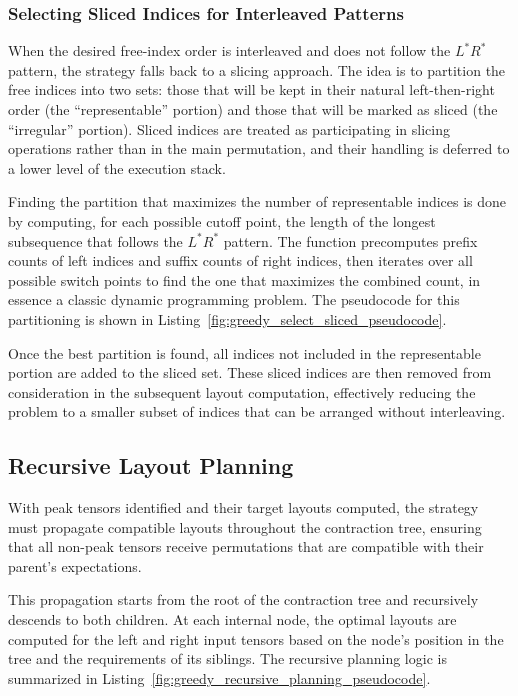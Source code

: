 \subsubsection{Selecting Sliced Indices for Interleaved Patterns}

When the desired free-index order is interleaved and does not follow the $L^* R^*$ pattern, the strategy falls back to a slicing approach. The idea is to partition the free indices into two sets: those that will be kept in their natural left-then-right order (the ``representable'' portion) and those that will be marked as sliced (the ``irregular'' portion). Sliced indices are treated as participating in slicing operations rather than in the main permutation, and their handling is deferred to a lower level of the execution stack.

Finding the partition that maximizes the number of representable indices is done by computing, for each possible cutoff point, the length of the longest subsequence that follows the $L^* R^*$ pattern. The function precomputes prefix counts of left indices and suffix counts of right indices, then iterates over all possible switch points to find the one that maximizes the combined count, in essence a classic dynamic programming problem. The pseudocode for this partitioning is shown in Listing~\ref{fig:greedy_select_sliced_pseudocode}.

Once the best partition is found, all indices not included in the representable portion are added to the sliced set. These sliced indices are then removed from consideration in the subsequent layout computation, effectively reducing the problem to a smaller subset of indices that can be arranged without interleaving.

\subsection{Recursive Layout Planning}

With peak tensors identified and their target layouts computed, the strategy must propagate compatible layouts throughout the contraction tree, ensuring that all non-peak tensors receive permutations that are compatible with their parent's expectations. 

This propagation starts from the root of the contraction tree and recursively descends to both children. At each internal node, the optimal layouts are computed for the left and right input tensors based on the node's position in the tree and the requirements of its siblings. The recursive planning logic is summarized in Listing~\ref{fig:greedy_recursive_planning_pseudocode}.

